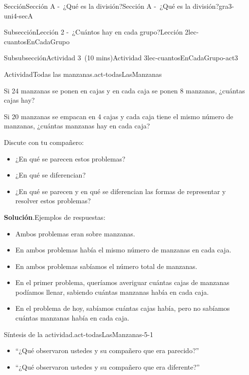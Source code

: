 \documentclass[oneside,10pt,]{article}
\newcommand{\blocktitlefont}{\relax}
\begin{document}
\begin{sectionptx}{Sección}{Sección A -~¿Qué es la división?}{}{Sección A -~¿Qué es la división?}{}{}{gra3-uni4-secA}
\begin{subsectionptx}{Subsección}{Lección 2 -~¿Cuántos hay en cada grupo?}{}{Lección 2}{}{}{lec-cuantosEnCadaGrupo}
\begin{subsubsectionptx}{Subsubsección}{Actividad 3~(10 mins)}{}{Actividad 3}{}{}{lec-cuantosEnCadaGrupo-act3}
\begin{activity}{Actividad}{Todas las manzanas.}{act-todasLasManzanas}
\begin{sidebyside}{2}{0.05}{0.05}{0.1}%
\begin{sbspanel}{0.4}%
Si 24 manzanas se ponen en cajas y en cada caja se ponen 8 manzanas, ¿cuántas cajas hay?%
\end{sbspanel}%
\begin{sbspanel}{0.4}%
\par
Si 20 manzanas se empacan en 4 cajas y cada caja tiene el mismo número de manzanas, ¿cuántas manzanas hay en cada caja?%
\end{sbspanel}%
\end{sidebyside}%
\par
Discute con tu compañero:%
\par
%
\begin{itemize}[label=\textbullet]
\item{}¿En qué se parecen estos problemas?%
\item{}¿En qué se diferencian?%
\item{}¿En qué se parecen y en qué se diferencian las formas de representar y resolver estos problemas?%
\end{itemize}
%
\par\smallskip%
\noindent\textbf{\blocktitlefont Solución}.\hypertarget{act-todasLasManzanas-3}{}\quad{}Ejemplos de respuestas:%
%
\begin{itemize}[label=\textbullet]
\item{}Ambos problemas eran sobre manzanas.%
\item{}En ambos problemas había el mismo número de manzanas en cada caja.%
\item{}En ambos problemas sabíamos el número total de manzanas.%
\item{}En el primer problema, queríamos averiguar cuántas cajas de manzanas podíamos llenar, sabiendo cuántas manzanas había en cada caja.%
\item{}En el problema de hoy, sabíamos cuántas cajas había, pero no sabíamos cuántas manzanas había en cada caja.%
\end{itemize}
\end{activity}%
\par
\begin{paragraphs}{Síntesis de la actividad.}{act-todasLasManzanas-5-1}%
%
\begin{itemize}[label=\textbullet]
\item{}``¿Qué observaron ustedes y su compañero que era parecido?''%
\item{}``¿Qué observaron ustedes y su compañero que era diferente?''%

\end{itemize}
\end{paragraphs}
\end{subsubsectionptx}
\end{subsectionptx}
\end{sectionptx}
\end{document}
